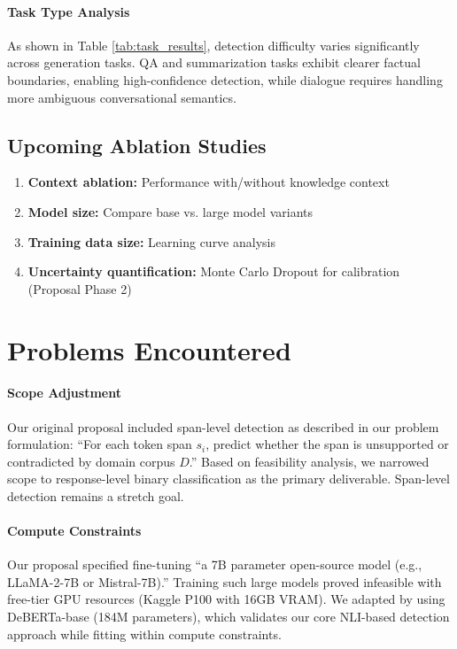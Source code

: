 \documentclass[11pt]{article}
\begin{document}
\paragraph{Task Type Analysis} As shown in Table \ref{tab:task_results}, detection difficulty varies significantly across generation tasks. QA and summarization tasks exhibit clearer factual boundaries, enabling high-confidence detection, while dialogue requires handling more ambiguous conversational semantics.

\subsection{Upcoming Ablation Studies}

\begin{enumerate}
    \item \textbf{Context ablation:} Performance with/without knowledge context
    \item \textbf{Model size:} Compare base vs. large model variants
    \item \textbf{Training data size:} Learning curve analysis
    \item \textbf{Uncertainty quantification:} Monte Carlo Dropout for calibration (Proposal Phase 2)
\end{enumerate}

\section{Problems Encountered}

\paragraph{Scope Adjustment} Our original proposal included span-level detection as described in our problem formulation: ``For each token span $s_i$, predict whether the span is unsupported or contradicted by domain corpus $D$.'' Based on feasibility analysis, we narrowed scope to response-level binary classification as the primary deliverable. Span-level detection remains a stretch goal.

\paragraph{Compute Constraints} Our proposal specified fine-tuning ``a 7B parameter open-source model (e.g., LLaMA-2-7B or Mistral-7B).'' Training such large models proved infeasible with free-tier GPU resources (Kaggle P100 with 16GB VRAM). We adapted by using DeBERTa-base (184M parameters), which validates our core NLI-based detection approach while fitting within compute constraints.
\end{document}
